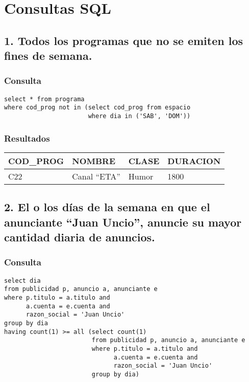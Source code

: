 \section{Consultas SQL}


\subsection*{1. \normalsize{Todos los programas que no se emiten los fines de semana.}}

\subsubsection*{Consulta}
\begin{lstlisting} 
select * from programa
where cod_prog not in (select cod_prog from espacio 
                       where dia in ('SAB', 'DOM'))
\end{lstlisting}

\subsubsection*{Resultados}
\begin{tabular}{|l|l|l|l|}
  \hline
    \bf{COD\_PROG} & \bf{NOMBRE} & \bf{CLASE} & \bf{DURACION} \\ 
  \hline
    C22 & Canal ``ETA'' & Humor & 1800 \\ 
  \hline
\end{tabular} 

\subsection*{2. \normalsize{El o los d\'ias de la semana en que el anunciante ``Juan Uncio'', anuncie su mayor cantidad diaria de anuncios.}}

\subsubsection*{Consulta}
\begin{lstlisting}
select dia 
from publicidad p, anuncio a, anunciante e
where p.titulo = a.titulo and 
      a.cuenta = e.cuenta and 
      razon_social = 'Juan Uncio'
group by dia
having count(1) >= all (select count(1)
                        from publicidad p, anuncio a, anunciante e
                        where p.titulo = a.titulo and 
                              a.cuenta = e.cuenta and
                              razon_social = 'Juan Uncio'
                        group by dia)
\end{lstlisting}

